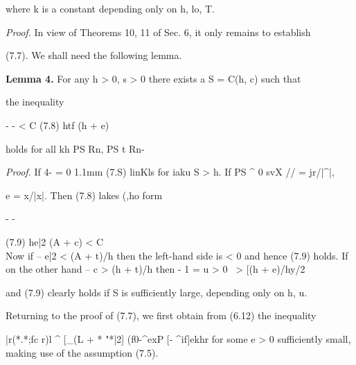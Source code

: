 where k is a constant depending only on h, lo, T.

\medskip\noindent\textit{Proof.} In view of Theorems 10, 11 of Sec. 6, it only remains to establish

\begin{ocrformula}
(7.7). We        shall need       the following lemma.
\end{ocrformula}

\medskip\noindent\textbf{Lemma 4.} For any h > 0, s > 0 there exists a S = C(h, c) such that

the inequality

\begin{ocrformula}
-         -                               < C\z\*
(7.8)                              h\x            tf         (h +          e)\e
\end{ocrformula}

holds for all kh PS Rn, PS t Rn-

\medskip\noindent\textit{Proof.} If 4- = 0 1.1mm (7.S) linKls for iaku S > h. If PS \textasciicircum{} 0 svX // = jr/|\textasciicircum{}|,

\begin{ocrformula}
e =     x/|x|. Then          (7.8) lakes         (,ho form
\end{ocrformula}

- -

\begin{ocrformula}
(7.9)                                  h\y         e|2           (A +        c) <     C\y\\
Now      if \y --  e|2 < (A + t)/h then the left-hand side is < 0 and                                               hence       (7.9)
holds.      If on the other hand \y -- c\2 > (h + t)/h then
- 1 = u > 0
\y\ > [(h + e)/hy/2
\end{ocrformula}

and (7.9) clearly holds if S is sufficiently large, depending only on h, u.

\begin{ocrformula}
Returning         to the proof of (7.7), we first obtain from                                (6.12) the inequality
\end{ocrformula}

\begin{ocrformula}
|r(*.*;fc r)l ^                                                                        [_(L        +    *       "*|2]
(f0-^exP                  [-          ^if]ekhr
for some      e > 0 sufficiently small, making        use of the assumption      (7.5).
\end{ocrformula}

